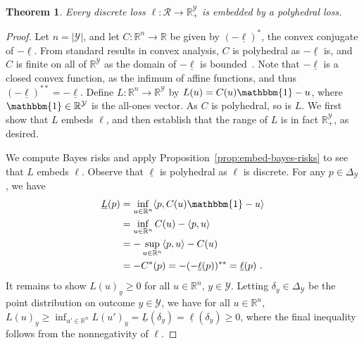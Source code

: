 \documentclass[11pt]{article}
\newcommand{\reals}{\mathbb{R}}
\newcommand{\simplex}{\Delta_\Y}
\newcommand{\R}{\mathcal{R}}
\newcommand{\Y}{\mathcal{Y}}
\newcommand{\risk}[1]{\underline{#1}}
\newcommand{\inprod}[2]{\langle #1, #2 \rangle}%
\newcommand{\ones}{\mathbbm{1}}
\newtheorem{theorem}{Theorem}
\begin{document}
\begin{theorem}\label{thm:discrete-loss-poly-embeddable}
  Every discrete loss $\ell:\R \to \reals^\Y_+$ is embedded by a polyhedral loss.
\end{theorem}
\begin{proof}
  Let $n = |\Y|$, and let $C:\reals^n \to \reals$ be given by $(-\risk{\ell})^*$, the convex conjugate of $-\risk{\ell}$.
  From standard results in convex analysis, $C$ is polyhedral as $-\risk{\ell}$ is, and $C$ is finite on all of $\reals^\Y$ as the domain of $-\risk{\ell}$ is bounded~\cite[Corollary 13.3.1]{rockafellar1997convex}.
  Note that $-\risk{\ell}$ is a closed convex function, as the infimum of affine functions, and thus $(-\risk{\ell})^{**} = -\risk{\ell}$.
  Define $L:\reals^n\to\reals^\Y$ by $L(u) = C(u)\ones - u$, where $\ones\in\reals^\Y$ is the all-ones vector.
  As $C$ is polyhedral, so is $L$.
  We first show that $L$ embeds $\ell$, and then establish that the range of $L$ is in fact $\reals^\Y_+$, as desired.

  We compute Bayes risks and apply Proposition~\ref{prop:embed-bayes-risks} to see that $L$ embeds $\ell$.
  Observe that $\risk{\ell}$ is polyhedral as $\ell$ is discrete.
  For any $p\in\simplex$, we have
  \begin{align*}
    \risk{L}(p)
    &= \inf_{u\in\reals^n} \inprod{p}{C(u)\ones - u}\\
    &= \inf_{u\in\reals^n} C(u) - \inprod{p}{u}\\
    &= -\sup_{u\in\reals^n} \inprod{p}{u} - C(u)\\
    &= -C^*(p) = - (-\risk{\ell}(p))^{**} = \risk{\ell}(p)~.
  \end{align*}
  It remains to show $L(u)_y \geq 0$ for all $u\in\reals^n$, $y\in\Y$.
  Letting $\delta_y\in\simplex$ be the point distribution on outcome $y\in\Y$, we have for all $u\in\reals^n$, $L(u)_y \geq \inf_{u'\in\reals^n} L(u')_y = \risk{L}(\delta_y) = \risk{\ell}(\delta_y) \geq 0$, where the final inequality follows from the nonnegativity of $\ell$.
\end{proof}
\end{document}
